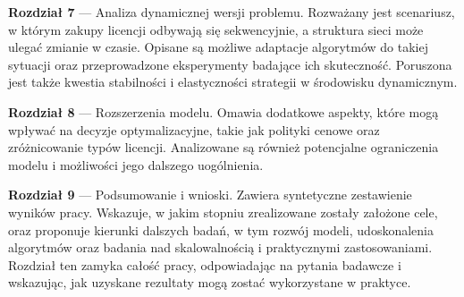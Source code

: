 \begin{description}
  \item \textbf{Rozdział 7} --- Analiza dynamicznej wersji problemu. Rozważany jest scenariusz, w którym zakupy licencji odbywają się sekwencyjnie, a struktura sieci może ulegać zmianie w czasie. Opisane są możliwe adaptacje algorytmów do takiej sytuacji oraz przeprowadzone eksperymenty badające ich skuteczność. Poruszona jest także kwestia stabilności i elastyczności strategii w środowisku dynamicznym.

  \item \textbf{Rozdział 8} --- Rozszerzenia modelu. Omawia dodatkowe aspekty, które mogą wpływać na decyzje optymalizacyjne, takie jak polityki cenowe oraz zróżnicowanie typów licencji. Analizowane są również potencjalne ograniczenia modelu i możliwości jego dalszego uogólnienia.

  \item \textbf{Rozdział 9} --- Podsumowanie i wnioski. Zawiera syntetyczne zestawienie wyników pracy. Wskazuje, w jakim stopniu zrealizowane zostały założone cele, oraz proponuje kierunki dalszych badań, w tym rozwój modeli, udoskonalenia algorytmów oraz badania nad skalowalnością i praktycznymi zastosowaniami. Rozdział ten zamyka całość pracy, odpowiadając na pytania badawcze i wskazując, jak uzyskane rezultaty mogą zostać wykorzystane w praktyce.
\end{description}
